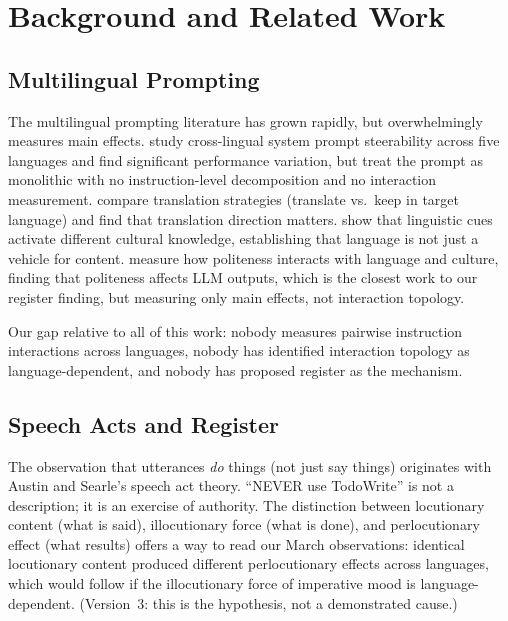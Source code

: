 \documentclass[11pt,a4paper]{article}
\begin{document}
\section{Background and Related Work}
\label{sec:background}

\subsection{Multilingual Prompting}

The multilingual prompting literature has grown rapidly, but
overwhelmingly measures main effects.
\citet{zhang2025crosslingual} study cross-lingual system prompt
steerability across five languages and find significant performance
variation, but treat the prompt as monolithic with no instruction-level
decomposition and no interaction measurement. \citet{naacl2025translation}
compare translation strategies (translate vs.\ keep in target language)
and find that translation direction matters. \citet{multilingual2025diversity}
show that linguistic cues activate different cultural knowledge,
establishing that language is not just a vehicle for content.
\citet{politeness2024} measure how politeness interacts with language
and culture, finding that politeness affects LLM outputs, which is the closest
work to our register finding, but measuring only main effects, not
interaction topology.

Our gap relative to all of this work: nobody measures pairwise
instruction interactions across languages, nobody has identified
interaction topology as language-dependent, and nobody has proposed
register as the mechanism.

\subsection{Speech Acts and Register}

The observation that utterances \emph{do} things (not just say
things) originates with Austin and Searle's speech act theory.
``NEVER use TodoWrite'' is not a description; it is an exercise of
authority. The distinction between locutionary content (what is said),
illocutionary force (what is done), and perlocutionary effect (what
results) offers a way to read our March observations: identical
locutionary content produced different perlocutionary effects across
languages, which would follow if the illocutionary force of
imperative mood is language-dependent. (Version~3: this is the
hypothesis, not a demonstrated cause.)
\end{document}
